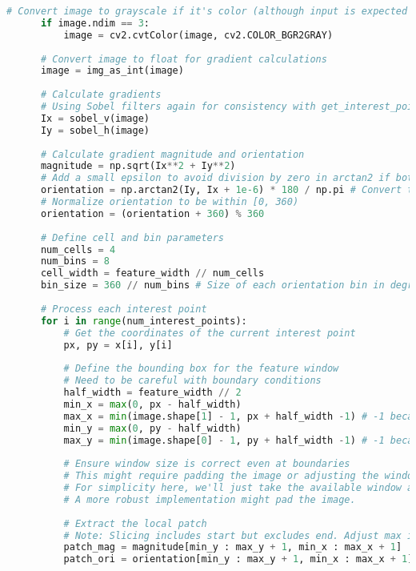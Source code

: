 \begin{lstlisting}[caption={student.py}, label={lst:code-example}, captionpos=t, language=python]
      # Convert image to grayscale if it's color (although input is expected to be grayscale based on notebook)
      if image.ndim == 3:
          image = cv2.cvtColor(image, cv2.COLOR_BGR2GRAY)
  
      # Convert image to float for gradient calculations
      image = img_as_int(image)
  
      # Calculate gradients
      # Using Sobel filters again for consistency with get_interest_points
      Ix = sobel_v(image)
      Iy = sobel_h(image)
  
      # Calculate gradient magnitude and orientation
      magnitude = np.sqrt(Ix**2 + Iy**2)
      # Add a small epsilon to avoid division by zero in arctan2 if both Ix and Iy are 0
      orientation = np.arctan2(Iy, Ix + 1e-6) * 180 / np.pi # Convert to degrees
      # Normalize orientation to be within [0, 360)
      orientation = (orientation + 360) % 360
  
      # Define cell and bin parameters
      num_cells = 4
      num_bins = 8
      cell_width = feature_width // num_cells
      bin_size = 360 // num_bins # Size of each orientation bin in degrees
  
      # Process each interest point
      for i in range(num_interest_points):
          # Get the coordinates of the current interest point
          px, py = x[i], y[i]
  
          # Define the bounding box for the feature window
          # Need to be careful with boundary conditions
          half_width = feature_width // 2
          min_x = max(0, px - half_width)
          max_x = min(image.shape[1] - 1, px + half_width -1) # -1 because max_x is inclusive index
          min_y = max(0, py - half_width)
          max_y = min(image.shape[0] - 1, py + half_width -1) # -1 because max_y is inclusive index
  
          # Ensure window size is correct even at boundaries
          # This might require padding the image or adjusting the window size/handling points near border
          # For simplicity here, we'll just take the available window and handle potential smaller size
          # A more robust implementation might pad the image.
  
          # Extract the local patch
          # Note: Slicing includes start but excludes end. Adjust max indices accordingly.
          patch_mag = magnitude[min_y : max_y + 1, min_x : max_x + 1]
          patch_ori = orientation[min_y : max_y + 1, min_x : max_x + 1]
  

\end{lstlisting}
